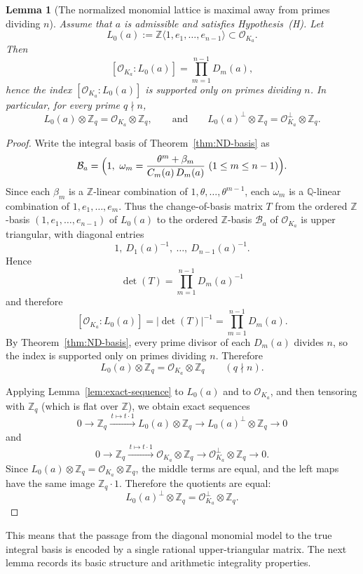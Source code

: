 \documentclass[11pt,letterpaper]{amsart}
\newcommand{\Q}{\mathbb{Q}}
\newcommand{\Z}{\mathbb{Z}}
\newcommand{\cO}{\mathcal{O}}
\theoremstyle{plain}
\newtheorem{lemma}[theorem]{Lemma}
\theoremstyle{definition}
\begin{document}
\begin{lemma}[The normalized monomial lattice is maximal away from primes dividing $n$]
\label{lem:monomial-max-away-n}
Assume that $a$ is admissible and satisfies Hypothesis~\textup{(H)}.
Let
\[
L_0(a):=\Z\langle 1,e_1,\dots,e_{n-1}\rangle\subset \cO_{K_a}.
\]
Then
\[
[\cO_{K_a}:L_0(a)]=\prod_{m=1}^{n-1}D_m(a),
\]
hence the index $[\cO_{K_a}:L_0(a)]$ is supported only on primes dividing $n$.
In particular, for every prime $q\nmid n$,
\[
L_0(a)\otimes \Z_q=\cO_{K_a}\otimes \Z_q,
\qquad\text{and}\qquad
L_0(a)^\perp\otimes \Z_q=\cO_{K_a}^\perp\otimes \Z_q.
\]
\end{lemma}

\begin{proof}
Write the integral basis of Theorem~\ref{thm:ND-basis} as
\[
\mathcal B_a=\Bigl(1,\ \omega_m=\frac{\theta^m+\beta_m}{C_m(a)\,D_m(a)}\ (1\le m\le n-1)\Bigr).
\]
Since each $\beta_m$ is a $\Z$-linear combination of $1,\theta,\dots,\theta^{m-1}$, each $\omega_m$ is a
$\Q$-linear combination of $1,e_1,\dots,e_m$.
Thus the change-of-basis matrix $T$ from the ordered $\Z$-basis $(1,e_1,\dots,e_{n-1})$ of $L_0(a)$
to the ordered $\Z$-basis $\mathcal B_a$ of $\cO_{K_a}$ is upper triangular, with diagonal entries
\[
1,\ D_1(a)^{-1},\ \dots,\ D_{n-1}(a)^{-1}.
\]
Hence
\[
\det(T)=\prod_{m=1}^{n-1}D_m(a)^{-1}
\]
and therefore
\[
[\cO_{K_a}:L_0(a)]=|\det(T)|^{-1}=\prod_{m=1}^{n-1}D_m(a).
\]
By Theorem~\ref{thm:ND-basis}, every prime divisor of each $D_m(a)$ divides $n$, so the index is supported
only on primes dividing $n$.
Therefore
\[
L_0(a)\otimes\Z_q=\cO_{K_a}\otimes\Z_q\qquad(q\nmid n).
\]

Applying Lemma~\ref{lem:exact-sequence} to \(L_0(a)\) and to \(\cO_{K_a}\), and then
tensoring with \(\Z_q\) (which is flat over \(\Z\)), we obtain exact sequences
\[
0\to \Z_q \xrightarrow{\,t\mapsto t\cdot 1\,} L_0(a)\otimes \Z_q
   \to L_0(a)^\perp\otimes \Z_q \to 0
\]
and
\[
0\to \Z_q \xrightarrow{\,t\mapsto t\cdot 1\,} \cO_{K_a}\otimes \Z_q
   \to \cO_{K_a}^\perp\otimes \Z_q \to 0.
\]
Since \(L_0(a)\otimes \Z_q=\cO_{K_a}\otimes \Z_q\), the middle terms are equal, and the
left maps have the same image \(\Z_q\cdot 1\). Therefore the quotients are equal:
\[
L_0(a)^\perp\otimes \Z_q=\cO_{K_a}^\perp\otimes \Z_q.
\]
\end{proof}

This means that the passage from the diagonal monomial model to the true integral basis is encoded by a single rational upper-triangular matrix. The next lemma records its basic structure and arithmetic integrality properties.
\end{document}
